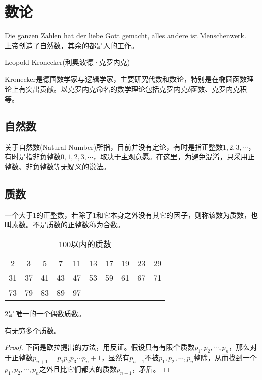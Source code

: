 
\chapter{数论}
\label{chap:number-theory}

\epigraph{Die ganzen Zahlen hat der liebe Gott gemacht, alles andere ist Menschenwerk.\\
  上帝创造了自然数，其余的都是人的工作。}{Leopold Kronecker(利奥波德·克罗内克)}

Kronecker是德国数学家与逻辑学家，主要研究代数和数论，特别是在椭圆函数理论上有突出贡献。以克罗内克命名的数学理论包括克罗内克$\delta$函数、克罗内克积等。

\section{自然数}
\label{sec:what-is-natural-number}

关于自然数(Natural Number)所指，目前并没有定论，有时是指正整数$1,2,3,\cdots$，有时是指非负整数$0,1,2,3,\cdots$，取决于主观意愿。在这里，为避免混淆，只采用正整数、非负整数等无疑义的说法。

\section{质数}
\label{sec:prime-number}

\begin{definition}
  一个大于$1$的正整数，若除了$1$和它本身之外没有其它的因子，则称该数为质数，也叫素数。不是质数的正整数称为合数。
\end{definition}

\begin{table}[htbp]
  \centering
  \caption{100以内的质数}
  \label{tab:prime-numbers<100}
  \begin{tabular}{cccccccccc}
    \hline
    2  & 3  & 5  & 7  & 11 & 13 & 17 & 19 & 23 & 29\\
    31 & 37 & 41 & 43 & 47 & 53 & 59 & 61 & 67 & 71\\
    73 & 79 & 83 & 89 & 97 &    &    &    &    &   \\
    \hline
  \end{tabular}
\end{table}

\begin{property}
  $2$是唯一的一个偶数质数。
\end{property}

\begin{theorem}
  有无穷多个质数。
\end{theorem}
\begin{proof}
  下面是欧拉提出的方法，用反证。假设只有有限个质数$p_1,p_2,\cdots,p_n$，那么对于正整数$p_{n+1}=p_1p_2p_3\cdots p_n + 1$，显然有$p_{n+1}$不被$p_1,p_2,\cdots,p_n$整除，从而找到一个$p_1,p_2,\cdots,p_n$之外且比它们都大的质数$p_{n+1}$，矛盾。
\end{proof}

